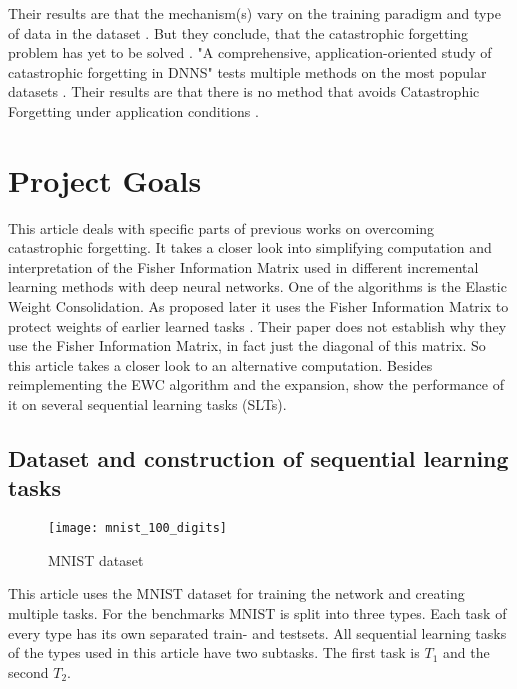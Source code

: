 Their results are that the mechanism(s) vary on the training paradigm and type of data in the dataset \cite{measuring_cf_in_nns}.
But they conclude, that the catastrophic forgetting problem has yet to be solved \cite{measuring_cf_in_nns}.
\newline
"A comprehensive, application-oriented study of catastrophic forgetting in DNNS" \cite{cf_application_oriented_study} tests multiple methods on the most popular datasets \cite{cf_application_oriented_study}.
Their results are that there is no method that avoids Catastrophic Forgetting under application conditions \cite{cf_application_oriented_study}.

\section{Project Goals}
\label{project_goals}

This article deals with specific parts of previous works on overcoming catastrophic forgetting.
It takes a closer look into simplifying computation and interpretation of the Fisher Information Matrix used in different incremental learning methods with deep neural networks.
One of the algorithms is the Elastic Weight Consolidation.
As proposed later it uses the Fisher Information Matrix to protect weights of earlier learned tasks \cite{elastic-weight-consolidation}.
Their paper does not establish why they use the Fisher Information Matrix, in fact just the diagonal of this matrix.
So this article takes a closer look to an alternative computation.
Besides reimplementing the EWC algorithm and the expansion, show the performance of it on several sequential learning tasks (SLTs).

\subsection*{Dataset and construction of sequential learning tasks}

\begin{figure}[H]
    \centering
    \texttt{[image: mnist\_100\_digits]}
    \caption{\cite{mnist_examples_image} MNIST dataset}
    \label{fig:intro_mnist_examples}
\end{figure}

This article uses the MNIST dataset for training the network and creating multiple tasks.
For the benchmarks MNIST is split into three types.
Each task of every type has its own separated train- and testsets.
All sequential learning tasks of the types used in this article have two subtasks.
The first task is $T_1$ and the second $T_2$.

